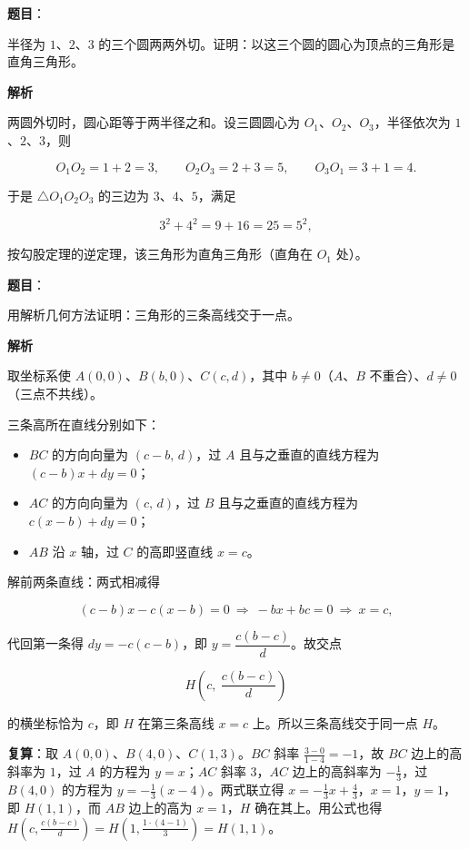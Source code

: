 \begin{answer}

\textbf{题目}：

半径为 $1$、$2$、$3$ 的三个圆两两外切。证明：以这三个圆的圆心为顶点的三角形是直角三角形。

\textbf{解析}

两圆外切时，圆心距等于两半径之和。设三圆圆心为 $O_1$、$O_2$、$O_3$，半径依次为 $1$、$2$、$3$，则

\nopagebreak[4]
\[
O_1O_2=1+2=3,\qquad O_2O_3=2+3=5,\qquad O_3O_1=3+1=4.
\]

于是 $\triangle O_1O_2O_3$ 的三边为 $3$、$4$、$5$，满足

\nopagebreak[4]
\[
3^2+4^2=9+16=25=5^2,
\]

按勾股定理的逆定理，该三角形为直角三角形（直角在 $O_1$ 处）。


\end{answer}
\begin{answer}

\textbf{题目}：

用解析几何方法证明：三角形的三条高线交于一点。

\textbf{解析}

取坐标系使 $A(0,0)$、$B(b,0)$、$C(c,d)$，其中 $b\neq0$（$A$、$B$ 不重合）、$d\neq0$（三点不共线）。

三条高所在直线分别如下：

\begin{itemize}
\item $BC$ 的方向向量为 $(c-b,\,d)$，过 $A$ 且与之垂直的直线方程为 $(c-b)x+dy=0$；
\item $AC$ 的方向向量为 $(c,\,d)$，过 $B$ 且与之垂直的直线方程为 $c(x-b)+dy=0$；
\item $AB$ 沿 $x$ 轴，过 $C$ 的高即竖直线 $x=c$。
\end{itemize}

解前两条直线：两式相减得

\nopagebreak[4]
\[
(c-b)x-c(x-b)=0\ \Longrightarrow\ -bx+bc=0\ \Longrightarrow\ x=c,
\]

代回第一条得 $dy=-c(c-b)$，即 $y=\dfrac{c(b-c)}{d}$。故交点

\nopagebreak[4]
\[
H\left(c,\ \frac{c(b-c)}{d}\right)
\]

的横坐标恰为 $c$，即 $H$ 在第三条高线 $x=c$ 上。所以三条高线交于同一点 $H$。

\textbf{复算}：取 $A(0,0)$、$B(4,0)$、$C(1,3)$。$BC$ 斜率 $\frac{3-0}{1-4}=-1$，故 $BC$ 边上的高斜率为 $1$，过 $A$ 的方程为 $y=x$；$AC$ 斜率 $3$，$AC$ 边上的高斜率为 $-\frac13$，过 $B(4,0)$ 的方程为 $y=-\frac13(x-4)$。两式联立得 $x=-\frac13x+\frac43$，$x=1$，$y=1$，即 $H(1,1)$，而 $AB$ 边上的高为 $x=1$，$H$ 确在其上。用公式也得 $H\left(c,\frac{c(b-c)}{d}\right)=H\left(1,\frac{1\cdot(4-1)}{3}\right)=H(1,1)$。


\end{answer}
